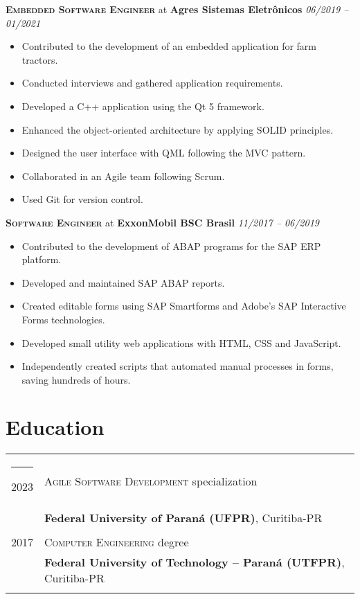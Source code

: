 \documentclass[a4paper,12pt]{article}
\begin{document}
\textbf{\textsc{Embedded Software Engineer}} at \textbf{Agres Sistemas Eletrônicos} \hfill \textit{06/2019 -- 01/2021}

{\small
\begin{itemize}[leftmargin=*,label=\large\textbullet]
    \setlength\itemsep{-0.2em}
    \item Contributed to the development of an embedded application for farm tractors.
    \item Conducted interviews and gathered application requirements.
    \item Developed a C++ application using the Qt 5 framework.
    \item Enhanced the object-oriented architecture by applying SOLID principles.
    \item Designed the user interface with QML following the MVC pattern.
    \item Collaborated in an Agile team following Scrum.
    \item Used Git for version control.
\end{itemize}
}

\textbf{\textsc{Software Engineer}} at \textbf{ExxonMobil BSC Brasil} \hfill \textit{11/2017 -- 06/2019}

{\small
\begin{itemize}[leftmargin=*,label=\large\textbullet]
    \setlength\itemsep{-0.2em}
    \item Contributed to the development of ABAP programs for the SAP ERP platform.
    \item Developed and maintained SAP ABAP reports.
    \item Created editable forms using SAP Smartforms and Adobe's SAP Interactive Forms technologies.
    \item Developed small utility web applications with HTML, CSS and JavaScript.
    \item Independently created scripts that automated manual processes in forms, saving hundreds of hours.
\end{itemize}
}
\section{Education}
\vspace{6pt}
\begin{tabular}{rl}

\rule{2cm}{0pt} 2023 & \textsc{Agile Software Development} specialization \\ &\normalsize\textbf{Federal University of Paraná (UFPR)}, Curitiba-PR\\&\\
2017 & \textsc{Computer Engineering} degree \\ &\normalsize\textbf{Federal University of Technology – Paraná (UTFPR)}, Curitiba-PR\\&\\
\end{tabular}
\end{document}
